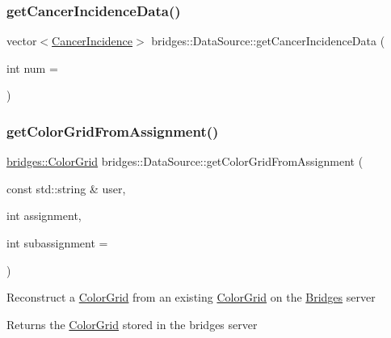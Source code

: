 \subsubsection{\texorpdfstring{get\+Cancer\+Incidence\+Data()}{getCancerIncidenceData()}}
{\footnotesize\ttfamily vector$<$\mbox{\hyperlink{classbridges_1_1_cancer_incidence}{Cancer\+Incidence}}$>$ bridges\+::\+Data\+Source\+::get\+Cancer\+Incidence\+Data (\begin{DoxyParamCaption}\item[{int}]{num = {} }\end{DoxyParamCaption})\hspace{0.3cm}{\ttfamily [inline]}}

\mbox{\label{classbridges_1_1_data_source_aa65136879011e1ec237380ef8587fea2}} 
\subsubsection{\texorpdfstring{get\+Color\+Grid\+From\+Assignment()}{getColorGridFromAssignment()}}
{\footnotesize\ttfamily \mbox{\hyperlink{classbridges_1_1_color_grid}{bridges\+::\+Color\+Grid}} bridges\+::\+Data\+Source\+::get\+Color\+Grid\+From\+Assignment (\begin{DoxyParamCaption}\item[{const std\+::string \&}]{user,  }\item[{int}]{assignment,  }\item[{int}]{subassignment = {} }\end{DoxyParamCaption})\hspace{0.3cm}{\ttfamily [inline]}}

Reconstruct a \mbox{\hyperlink{classbridges_1_1_color_grid}{Color\+Grid}} from an existing \mbox{\hyperlink{classbridges_1_1_color_grid}{Color\+Grid}} on the \mbox{\hyperlink{classbridges_1_1_bridges}{Bridges}} server

\begin{DoxyReturn}{Returns}
the \mbox{\hyperlink{classbridges_1_1_color_grid}{Color\+Grid}} stored in the bridges server 
\end{DoxyReturn}

